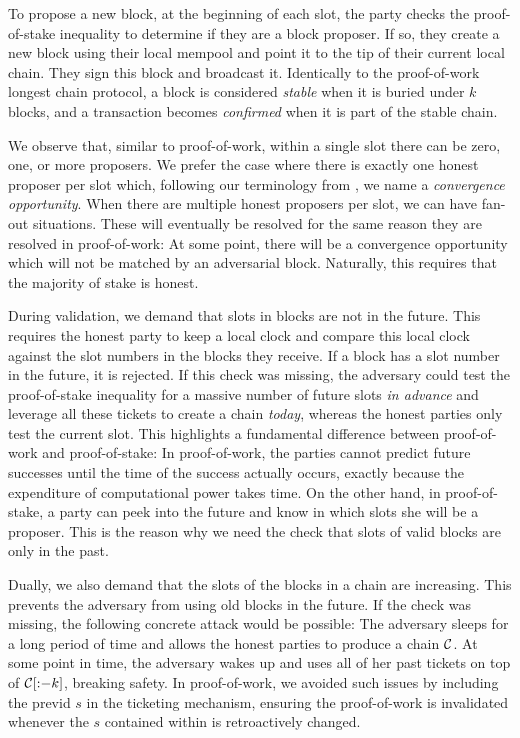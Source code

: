 To propose a new block,
at the beginning of each slot, the party checks the proof-of-stake inequality to determine if they
are a block proposer. If so, they create a new block using their local mempool and point it to the
tip of their current local chain. They sign this block and broadcast it. Identically to the
proof-of-work longest chain protocol, a block is considered
\emph{stable} when it is buried under $k$ blocks, and a transaction becomes \emph{confirmed} when it is part
of the stable chain.

We observe that, similar to proof-of-work, within a single slot there can be zero, one, or more
proposers. We prefer the case where there is exactly one honest proposer per slot which, following
our terminology from , we name a \emph{convergence opportunity}.
When there are multiple
honest proposers per slot, we can have fan-out situations. These will eventually be resolved for the
same reason they are resolved in proof-of-work: At some point, there will be a convergence
opportunity which will not be matched by an adversarial block. Naturally, this requires that
the majority of stake is honest.

During validation, we demand that slots in blocks are not in the future. This requires the
honest party to keep a local clock and compare this local clock against the slot numbers in the
blocks they receive. If a block has a slot number in the future, it is rejected. If this check
was missing, the adversary could test the proof-of-stake inequality for a massive number
of future slots \emph{in advance} and leverage
all these tickets to create a chain \emph{today}, whereas the honest parties only test the
current slot.
This highlights a fundamental difference between
proof-of-work and proof-of-stake: In proof-of-work, the parties cannot predict future successes
until the time of the success actually occurs, exactly because the expenditure of computational
power takes time. On the other hand, in proof-of-stake, a party can peek into the future and
know in which slots she will be a proposer. This is the reason why we need the check that
slots of valid blocks are only in the past.

Dually, we also demand that the slots of the blocks in a chain are increasing.
This prevents the adversary from using old blocks in the future. If the check was missing, the following
concrete attack would be possible: The adversary sleeps for a long period of time and allows the honest parties
to produce a chain $\mathcal{C}$. At some point in time, the adversary wakes up and uses all of her past
tickets on top of $\mathcal{C}[{:}{-k}]$, breaking safety. In proof-of-work, we avoided such issues
by including the previd $s$ in the ticketing mechanism, ensuring the proof-of-work is invalidated whenever the
$s$ contained within is retroactively changed.

